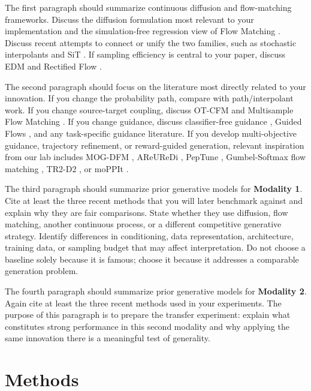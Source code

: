 \documentclass{article}
\begin{document}
The first paragraph should summarize continuous diffusion and flow-matching frameworks. Discuss the diffusion formulation most relevant to your implementation and the simulation-free regression view of Flow Matching \citep{lipman2022flow}. Discuss recent attempts to connect or unify the two families, such as stochastic interpolants \citep{albergo2025stochastic} and SiT \citep{ma2024sit}. If sampling efficiency is central to your paper, discuss EDM \citep{karras2022elucidating} and Rectified Flow \citep{liu2022flow}.

The second paragraph should focus on the literature most directly related to your innovation. If you change the probability path, compare with path/interpolant work. If you change source-target coupling, discuss OT-CFM \citep{tong2023improving} and Multisample Flow Matching \citep{pooladian2023multisample}. If you change guidance, discuss classifier-free guidance \citep{ho2022classifier}, Guided Flows \citep{zheng2023guided}, and any task-specific guidance literature. If you develop multi-objective guidance, trajectory refinement, or reward-guided generation, relevant inspiration from our lab includes MOG-DFM \citep{chen2025multi}, AReUReDi \citep{chen2025areuredi}, PepTune \citep{tang2025peptune}, Gumbel-Softmax flow matching \citep{tang2025gumbel}, TR2-D2 \citep{tang2025tr2}, or moPPIt \citep{chen2024moppit}.

The third paragraph should summarize prior generative models for \textbf{Modality 1}. Cite at least the three recent methods that you will later benchmark against and explain why they are fair comparisons. State whether they use diffusion, flow matching, another continuous process, or a different competitive generative strategy. Identify differences in conditioning, data representation, architecture, training data, or sampling budget that may affect interpretation. Do not choose a baseline solely because it is famous; choose it because it addresses a comparable generation problem.

The fourth paragraph should summarize prior generative models for \textbf{Modality 2}. Again cite at least the three recent methods used in your experiments. The purpose of this paragraph is to prepare the transfer experiment: explain what constitutes strong performance in this second modality and why applying the same innovation there is a meaningful test of generality.

\section{Methods}
\end{document}
